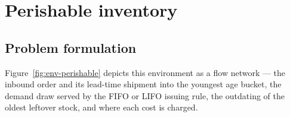 %
%
\section{Perishable inventory}
\label{sec:perishable}

\subsection{Problem formulation}
\label{sec:perishable-formulation}

Figure~\ref{fig:env-perishable} depicts this environment as a flow network --- the inbound order and
its lead-time shipment into the youngest age bucket, the demand draw served by the FIFO or LIFO
issuing rule, the outdating of the oldest leftover stock, and where each cost is charged.

